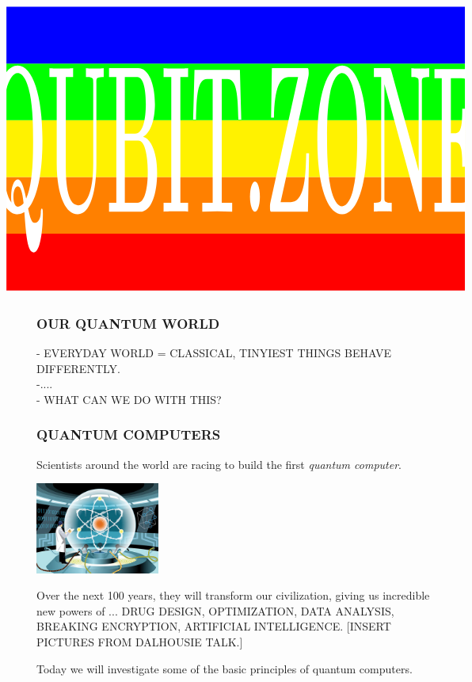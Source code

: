 \documentclass[aspectratio=169]{beamer}
\begin{document}
{
\begin{frame}
\vspace{-20pt}
\[
\hspace{-2cm}
\begin{tikzpicture}[xscale=1.2, yscale=1.8]
\foreach \x/\y in {0/red,1/orange,2/yellow,3/green,4/blue} {
  \path [fill=\y] (0,\x) rectangle +(\textwidth,1);
}
\path [use as bounding box] (current bounding box.south west) rectangle (current bounding box.north east);
\node [scale=2.5, white, yscale=3.04] at (0.5*\textwidth,2.29) {\Huge\bf QUBIT.ZONE};
\end{tikzpicture}
\hspace{-2cm}
\]

\end{frame}
}

\addtocounter{framenumber}{-1}




\begin{frame}
\frametitle{OUR QUANTUM WORLD}
- EVERYDAY WORLD = CLASSICAL, TINYIEST THINGS BEHAVE DIFFERENTLY.\\
-....\\
- WHAT CAN WE DO WITH THIS?
\end{frame}
\begin{frame}
\frametitle{QUANTUM COMPUTERS}

\begin{minipage}{0.5\textwidth}\raggedright
Scientists around the world are racing to build the first \textit{quantum computer}.
\end{minipage}
\begin{minipage}{0.4\textwidth}\raggedright
\includegraphics[height=3cm]{images/quantum_atom_in_room.png}
\end{minipage}

\vspace{15pt}
Over the next 100 years, they will transform our civilization, giving us incredible new powers of ... DRUG DESIGN, OPTIMIZATION, DATA ANALYSIS, BREAKING ENCRYPTION, ARTIFICIAL INTELLIGENCE. [INSERT PICTURES FROM DALHOUSIE TALK.]

\vspace{15pt}
Today we will investigate some of the basic principles of quantum computers.

\end{frame}
\end{document}
